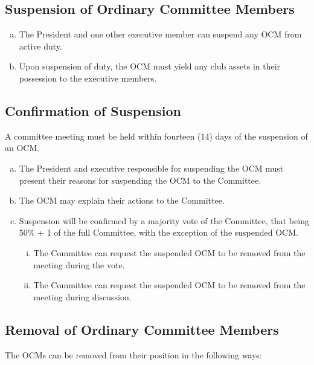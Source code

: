 \documentclass[a4paper,12pt]{article}
\begin{document}
\subsection{Suspension of Ordinary Committee Members}

\begin{enumerate}[a)]
	\item The President and one other executive member can suspend any OCM from active duty.
	\item Upon suspension of duty, the OCM must yield any club assets in their possession to the executive members.
\end{enumerate}

\subsection{Confirmation of Suspension}

A committee meeting must be held within fourteen (14) days of the suspension of an OCM.

\begin{enumerate}[a)]
	\item The President and executive responsible for suspending the OCM must present their reasons for suspending the OCM to the Committee.
	\item The OCM may explain their actions to the Committee.
	\item Suspension will be confirmed by a majority vote of the Committee, that being 50\% + 1 of the full Committee, with the exception of the suspended OCM.
	\begin{enumerate}[i)]
		\item The Committee can request the suspended OCM to be removed from the meeting during the vote.
		\item The Committee can request the suspended OCM to be removed from the meeting during discussion.
	\end{enumerate}
\end{enumerate}

\subsection{Removal of Ordinary Committee Members}

The OCMs can be removed from their position in the following ways:
\end{document}
